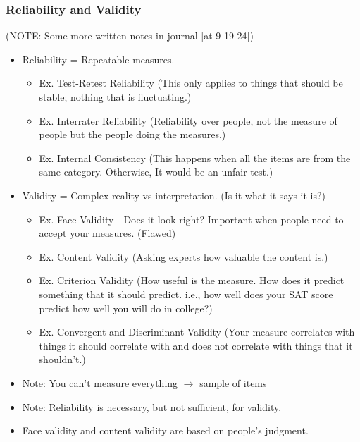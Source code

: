 \documentclass{report}
\begin{document}
\subsubsection{Reliability and Validity}
(NOTE: Some more written notes in journal [at 9-19-24])
\begin{itemize}
    \item Reliability = Repeatable measures.
        \begin{itemize}
            \item Ex. Test-Retest Reliability (This only applies to things that should be stable; nothing that is fluctuating.) 
            \item Ex. Interrater Reliability (Reliability over people, not the measure of people but the people doing the measures.) 
            \item Ex. Internal Consistency (This happens when all the items are from the same category. Otherwise, It would be an unfair test.)
        \end{itemize}
    \item Validity = Complex reality vs interpretation. (Is it what it says it is?) 
        \begin{itemize}
            \item Ex. Face Validity - Does it look right? Important when people need to accept your measures. (Flawed)
            \item Ex. Content Validity (Asking experts how valuable the content is.)  
            \item Ex. Criterion Validity (How useful is the measure. How does it predict something that it should predict. i.e., how well does your SAT score predict how well you will do in college?) 
            \item Ex. Convergent and Discriminant Validity (Your measure correlates with things it should correlate with and does not correlate with things that it shouldn't.) 
        \end{itemize}
    \item Note: You can't measure everything $\rightarrow$ sample of items  
    \item Note: Reliability is necessary, but not sufficient, for validity.    
    \item Face validity and content validity are based on people's judgment. 
\end{itemize}
\end{document}
